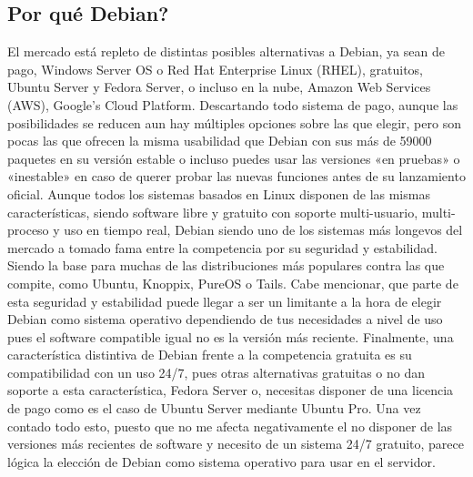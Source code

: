 \subsection{Por qué Debian?}
El mercado está repleto de distintas posibles alternativas a Debian, ya sean de pago, Windows Server OS o Red Hat Enterprise Linux (RHEL), gratuitos, Ubuntu Server y Fedora Server, o incluso en la nube, Amazon Web Services (AWS), Google’s Cloud Platform.
\newline
\newline
Descartando todo sistema de pago, aunque las posibilidades se reducen aun hay múltiples opciones sobre las que elegir, pero son pocas las que ofrecen la misma usabilidad que Debian con sus más de 59000 paquetes en su versión estable o incluso puedes usar las versiones «en pruebas» o «inestable» en caso de querer probar las nuevas funciones antes de su lanzamiento oficial.
\newline
\newline
Aunque todos los sistemas basados en Linux disponen de las mismas características, siendo software libre y gratuito con soporte multi-usuario, multi-proceso y uso en tiempo real, Debian siendo uno de los sistemas más longevos del mercado a tomado fama entre la competencia por su seguridad y estabilidad. Siendo la base para muchas de las distribuciones más populares contra las que compite, como Ubuntu, Knoppix, PureOS o Tails.
\newline
\newline
Cabe mencionar, que parte de esta seguridad y estabilidad puede llegar a ser un limitante a la hora de elegir Debian como sistema operativo dependiendo de tus necesidades a nivel de uso pues el software compatible igual no es la versión más reciente.
\newline
\newline
Finalmente, una característica distintiva de Debian frente a la competencia gratuita es su compatibilidad con un uso 24/7, pues otras alternativas gratuitas o no dan soporte a esta característica, Fedora Server o, necesitas disponer de una licencia de pago como es el caso de Ubuntu Server mediante Ubuntu Pro.
\newline
\newline
Una vez contado todo esto, puesto que no me afecta negativamente el no disponer de las versiones más recientes de software y necesito de un sistema 24/7 gratuito, parece lógica la elección de Debian como sistema operativo para usar en el servidor.

\newpage

